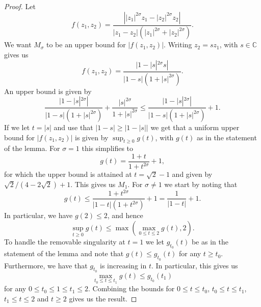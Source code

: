\documentclass[11pt]{article}
\begin{document}
\begin{proof}
  Let
  \begin{equation*}
    f(z_{1}, z_{2}) = \frac{
      \left||z_{1}|^{2\sigma}z_{1} - |z_{2}|^{2\sigma}z_{2}\right|
    }{
      |z_{1} - z_{2}|(|z_{1}|^{2\sigma} + |z_{2}|^{2\sigma})
    }.
  \end{equation*}
  We want \(M_\sigma\) to be an upper bound for \(|f(z_1, z_2)|\). Writing
  \(z_2 = sz_1\), with \(s \in \mathbb{C}\) gives us
  \begin{equation*}
    f(z_1, z_2) = \frac{|1 - |s|^{2\sigma}s|}{|1 - s|(1 + |s|^{2\sigma})}.
  \end{equation*}
  An upper bound is given by
  \begin{equation*}
    \frac{|1 - |s|^{2\sigma}|}{|1 - s|(1 + |s|^{2\sigma})} + \frac{|s|^{2\sigma}}{1 + |s|^{2\sigma}}
    \leq \frac{|1 - |s|^{2\sigma}|}{|1 - s|(1 + |s|^{2\sigma})} + 1.
  \end{equation*}
  If we let \(t = |s|\) and use that \(|1 - s| \geq |1 - |s||\) we get
  that a uniform upper bound for \(|f(z_1, z_2)|\) is given by
  \(\sup_{t \geq 0} g(t)\), with \(g(t)\) as in the statement of the
  lemma. For \(\sigma = 1\) this simplifies to
  \begin{equation*}
    g(t) = \frac{1 + t}{1 + t^{2\sigma}} + 1,
  \end{equation*}
  for which the upper bound is attained at \(t = \sqrt{2} - 1\) and
  given by \(\sqrt{2} / (4 - 2\sqrt{2}) + 1\). This gives us \(M_1\).
  For \(\sigma \neq 1\) we start by noting that
  \begin{equation*}
    g(t)
    \leq \frac{1 + t^{2\sigma}}{|1 - t|(1 + t^{2\sigma})} + 1
    = \frac{1}{|1 - t|} + 1.
  \end{equation*}
  In particular, we have \(g(2) \leq 2\), and hence
  \begin{equation*}
    \sup_{t \geq 0} g(t) \leq \max\left(\max_{0 \leq t \leq 2} g(t), 2\right).
  \end{equation*}
  To handle the removable singularity at \(t = 1\) we let
  \(g_{t_{0}}(t)\) be as in the statement of the lemma and note that
  \(g(t) \leq g_{t_0}(t)\) for any \(t \geq t_0\). Furthermore, we
  have that \(g_{t_0}\) is increasing in \(t\). In particular, this
  gives us
  \begin{equation*}
    \max_{t_{0} \leq t \leq t_{1}} g(t) \leq g_{t_{0}}(t_{1})
  \end{equation*}
  for any \(0 \leq t_0 \leq 1 \leq t_1 \leq 2\). Combining the bounds
  for \(0 \leq t \leq t_0\), \(t_0 \leq t \leq t_1\), \(t_1 \leq t \leq
  2\) and \(t \geq 2\) gives us the result.



\end{proof}
\end{document}
